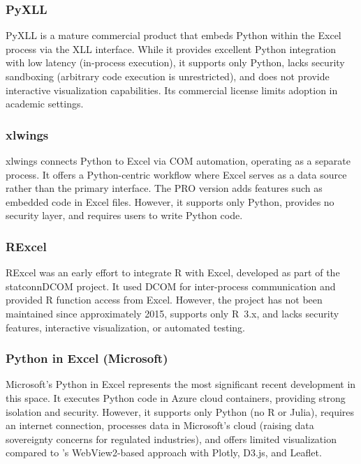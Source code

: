 \subsubsection{PyXLL}

PyXLL \citep{PyXLL2023} is a mature commercial product that embeds Python within the Excel process via the XLL interface. While it provides excellent Python integration with low latency (in-process execution), it supports only Python, lacks security sandboxing (arbitrary code execution is unrestricted), and does not provide interactive visualization capabilities. Its commercial license limits adoption in academic settings.

\subsubsection{xlwings}

xlwings \citep{xlwings2023} connects Python to Excel via COM automation, operating as a separate process. It offers a Python-centric workflow where Excel serves as a data source rather than the primary interface. The PRO version adds features such as embedded code in Excel files. However, it supports only Python, provides no security layer, and requires users to write Python code.

\subsubsection{RExcel}

RExcel \citep{Baier2011} was an early effort to integrate R with Excel, developed as part of the statconnDCOM project. It used DCOM for inter-process communication and provided R function access from Excel. However, the project has not been maintained since approximately 2015, supports only R~3.x, and lacks security features, interactive visualization, or automated testing.

\subsubsection{Python in Excel (Microsoft)}

Microsoft's Python in Excel \citep{MicrosoftPython2023} represents the most significant recent development in this space. It executes Python code in Azure cloud containers, providing strong isolation and security. However, it supports only Python (no R or Julia), requires an internet connection, processes data in Microsoft's cloud (raising data sovereignty concerns for regulated industries), and offers limited visualization compared to \neven{}'s WebView2-based approach with Plotly, D3.js, and Leaflet.

